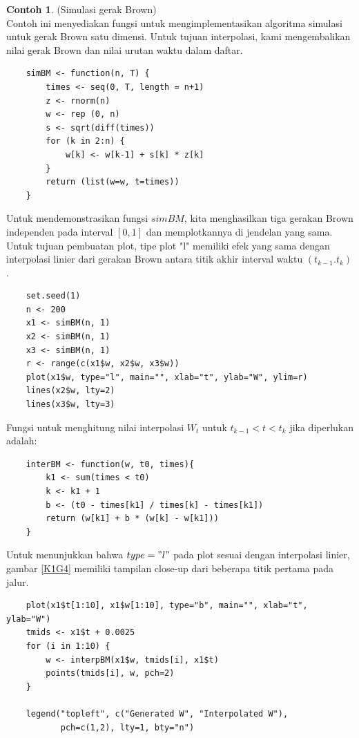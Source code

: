 \documentclass[a4paper,12pt]{article}
\theoremstyle{definition}
\newtheorem{example}{Contoh}[section]
\begin{document}
\begin{example} (Simulasi gerak Brown) \label{C7}\\
Contoh ini menyediakan fungsi untuk mengimplementasikan algoritma simulasi untuk gerak Brown satu dimensi. Untuk tujuan interpolasi, kami mengembalikan nilai gerak Brown dan nilai urutan waktu dalam daftar.

\begin{lstlisting}
    simBM <- function(n, T) {
        times <- seq(0, T, length = n+1)
        z <- rnorm(n)
        w <- rep (0, n)
        s <- sqrt(diff(times))
        for (k in 2:n) {
            w[k] <- w[k-1] + s[k] * z[k]
        }
        return (list(w=w, t=times))
    }
\end{lstlisting}

Untuk mendemonstrasikan fungsi $simBM$, kita menghasilkan tiga gerakan Brown independen pada interval $[0, 1]$ dan memplotkannya di jendelan yang sama. Untuk tujuan pembuatan plot, tipe plot "l" memiliki efek yang sama dengan interpolasi linier dari gerakan Brown antara titik akhir interval waktu $(t_{k-1}. t_k)$.

\begin{lstlisting}
    set.seed(1)
    n <- 200
    x1 <- simBM(n, 1)
    x2 <- simBM(n, 1)
    x3 <- simBM(n, 1)
    r <- range(c(x1$w, x2$w, x3$w))
    plot(x1$w, type="l", main="", xlab="t", ylab="W", ylim=r)
    lines(x2$w, lty=2)
    lines(x3$w, lty=3)
\end{lstlisting}

Fungsi untuk menghitung nilai interpolasi $W_t$ untuk $t_{k-1} < t < t_k$ jika diperlukan adalah:

\begin{lstlisting}
    interBM <- function(w, t0, times){
        k1 <- sum(times < t0)
        k <- k1 + 1
        b <- (t0 - times[k1] / times[k] - times[k1])
        return (w[k1] + b * (w[k] - w[k1]))
    }
\end{lstlisting}

Untuk menunjukkan bahwa $type="l"$ pada plot sesuai dengan interpolasi linier, gambar \ref{K1G4} memiliki tampilan close-up dari beberapa titik pertama pada jalur.

\begin{lstlisting}
    plot(x1$t[1:10], x1$w[1:10], type="b", main="", xlab="t", ylab="W")
    tmids <- x1$t + 0.0025
    for (i in 1:10) {
        w <- interpBM(x1$w, tmids[i], x1$t)
        points(tmids[i], w, pch=2)
    }

    legend("topleft", c("Generated W", "Interpolated W"),
           pch=c(1,2), lty=1, bty="n")
\end{lstlisting}

\end{example}
\end{document}
